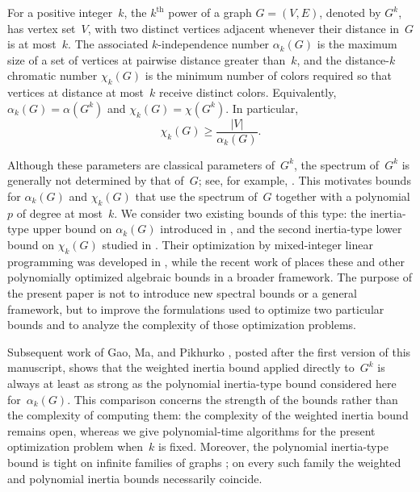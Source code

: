 \documentclass[10pt]{article}
\begin{document}
For a positive integer~\(k\), the \(k^{\mathrm{th}}\) power of a graph \(G=(V,E)\), denoted by \(G^k\), has vertex set~\(V\), with two distinct vertices adjacent whenever their distance in~\(G\) is at most~\(k\). The associated \(k\)-independence number \(\alpha_k(G)\) is the maximum size of a set of vertices at pairwise distance greater than~\(k\), and the distance-\(k\) chromatic number \(\chi_k(G)\) is the minimum number of colors required so that vertices at distance at most~\(k\) receive distinct colors. Equivalently, \(\alpha_k(G)=\alpha(G^k)\) and \(\chi_k(G)=\chi(G^k)\). In particular,
\begin{equation}\label{lem:alpha_chi_relation}
    \chi_k(G)\geq \frac{|V|}{\alpha_k(G)}.
\end{equation}

Although these parameters are classical parameters of~\(G^k\), the spectrum of~\(G^k\) is generally not determined by that of~\(G\); see, for example, \cite{acfns2020,Das2013LaplacianGraph,JZ2017}. This motivates bounds for \(\alpha_k(G)\) and \(\chi_k(G)\) that use the spectrum of~\(G\) together with a polynomial \(p\) of degree at most~\(k\). We consider two existing bounds of this type: the inertia-type upper bound on \(\alpha_k(G)\) introduced in \cite{acf2019}, and the second inertia-type lower bound on \(\chi_k(G)\) studied in \cite{acfns2020}. Their optimization by mixed-integer linear programming was developed in \cite{acfns2020}, while the recent work of \cite{AM2025} places these and other polynomially optimized algebraic bounds in a broader framework. The purpose of the present paper is not to introduce new spectral bounds or a general framework, but to improve the formulations used to optimize two particular bounds and to analyze the complexity of those optimization problems.

Subsequent work of Gao, Ma, and Pikhurko \cite{GaoMaPikhurko2026}, posted after the first version of this manuscript, shows that the weighted inertia bound applied directly to~\(G^k\) is always at least as strong as the polynomial inertia-type bound considered here for~\(\alpha_k(G)\). This comparison concerns the strength of the bounds rather than the complexity of computing them: the complexity of the weighted inertia bound remains open, whereas we give polynomial-time algorithms for the present optimization problem when~\(k\) is fixed. Moreover, the polynomial inertia-type bound is tight on infinite families of graphs \cite{acfns2020}; on every such family the weighted and polynomial inertia bounds necessarily coincide.
\end{document}
